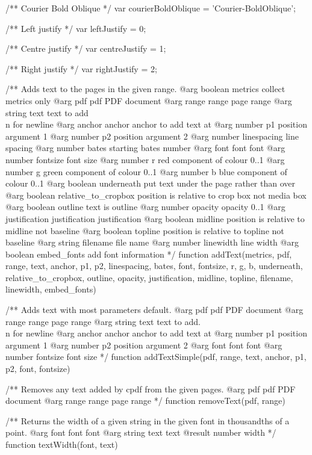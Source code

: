 /** Courier Bold Oblique */
var courierBoldOblique = 'Courier-BoldOblique';

/** Left justify */
var leftJustify = 0;

/** Centre justify */
var centreJustify = 1;

/** Right justify */
var rightJustify = 2;

/** Adds text to the pages in the given range.
@arg {boolean} metrics collect metrics only
@arg {pdf} pdf PDF document
@arg {range} range page range
@arg {string} text text to add \\n for newline
@arg {anchor} anchor anchor to add text at
@arg {number} p1 position argument 1
@arg {number} p2 position argument 2
@arg {number} linespacing line spacing
@arg {number} bates starting bates number
@arg {font} font font
@arg {number} fontsize font size
@arg {number} r red component of colour 0..1
@arg {number} g green component of colour 0..1
@arg {number} b blue component of colour 0..1
@arg {boolean} underneath put text under the page rather than over
@arg {boolean} relative_to_cropbox position is relative to crop box not media box
@arg {boolean} outline text is outline
@arg {number} opacity opacity 0..1
@arg {justification} justification justification
@arg {boolean} midline position is relative to midline not baseline
@arg {boolean} topline position is relative to topline not baseline
@arg {string} filename file name
@arg {number} linewidth line width
@arg {boolean} embed_fonts add font information
*/
function addText(metrics, pdf, range, text, anchor, p1, p2, linespacing,
                 bates, font, fontsize, r, g, b, underneath, relative_to_cropbox, outline,
                 opacity, justification, midline, topline, filename, linewidth, embed_fonts) {}

/** Adds text with most parameters default.
@arg {pdf} pdf PDF document
@arg {range} range page range
@arg {string} text text to add. \\n for newline
@arg {anchor} anchor anchor to add text at
@arg {number} p1 position argument 1
@arg {number} p2 position argument 2
@arg {font} font font
@arg {number} fontsize font size */
function addTextSimple(pdf, range, text, anchor, p1, p2, font, fontsize) {}

/** Removes any text added by cpdf from the given pages.
@arg {pdf} pdf PDF document
@arg {range} range page range */
function removeText(pdf, range) {}

/** Returns the width of a given string in the given font in thousandths of a
point.
@arg {font} font font
@arg {string} text text
@result {number} width */
function textWidth(font, text) {}

